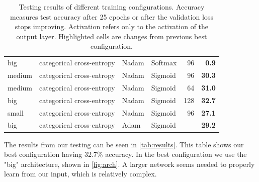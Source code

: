 \documentclass[11pt, twocolumn]{article}
\begin{document}
\begin{table}
\begin{tabular}{@{}llllrr@{}}
        big                            & categorical cross-entropy                    & Nadam                         & \cellcolor[HTML]{FFCCC9}Softmax & \multicolumn{1}{r|}{96}                                                 & \textbf{0.9}                               \\
        \cellcolor[HTML]{FFCCC9}medium & categorical cross-entropy                    & Nadam                         & Sigmoid                         & \multicolumn{1}{r|}{96}                                                 & \textbf{30.3}                              \\
        \cellcolor[HTML]{FFCCC9}medium & categorical cross-entropy                    & Nadam                         & Sigmoid                         & \multicolumn{1}{r|}{\cellcolor[HTML]{FFCCC9}64}                         & \textbf{31.0}                              \\
        big                            & categorical cross-entropy                    & Nadam                         & Sigmoid                         & \multicolumn{1}{r|}{\cellcolor[HTML]{9AFF99}128}                        & \textbf{32.7}                              \\
        \cellcolor[HTML]{FFCCC9}small  & categorical cross-entropy                    & Nadam                         & Sigmoid                         & \multicolumn{1}{r|}{96}                                                 & \textbf{27.1}                              \\
        big                            & categorical cross-entropy                    & \cellcolor[HTML]{FFCCC9}Adam  & Sigmoid                         & \multicolumn{1}{r|}{\cellcolor[HTML]{FFFFFF}{\color[HTML]{000000} 128}} & \textbf{29.2}                              \\
        \bottomrule
    \end{tabular}
    \caption{Testing results of different training configurations. Accuracy measures test accuracy after 25 epochs or after the validation loss stops improving. Activation refers only to the activation of the output layer. Highlighted cells are changes from previous best configuration. }
    \label{tab:results}
\end{table}

The results from our testing can be seen in \autoref{tab:results}. This table shows our best configuration having 32.7\% accuracy. In the best configuration we use the "big" architecture, shown in \autoref{fig:arch}. A larger network seems needed to properly learn from our input, which is relatively complex. 
\end{document}
